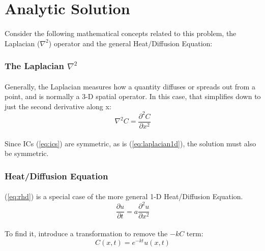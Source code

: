 \section{Analytic Solution}
\paragraph{}
Consider the following mathematical concepts related to this problem, the Laplacian ($\nabla^2$) operator and the general Heat/Diffusion Equation:

\subsubsection*{The Laplacian $\nabla^2$}
\paragraph{}
Generally, the Laplacian measures how a quantity diffuses or spreads out from a point, and is normally a 3-D spatial operator. In this case, that simplifies down to just the second derivative along x:
\begin{equation}
\label{eq:laplacian1d}
\nabla^2 C = \frac{\partial^2 C}{\partial x^2}
\end{equation}
\paragraph{}
Since ICs (\ref{eq:ics}) are symmetric, as is (\ref{eq:laplacian1d}), the solution must also be symmetric.

\subsubsection*{Heat/Diffusion Equation}
\paragraph{}
(\ref{eq:rhd}) is a special case of the more general 1-D Heat/Diffusion Equation. 
\begin{equation}
\label{eq:hde}
\frac{\partial u}{\partial t} = a \frac{\partial^2 u}{\partial x^2}
\end{equation}
\paragraph{}
To find it, introduce a transformation to remove the $-kC$ term:
\begin{equation}
\label{eq:c1}
C(x,t) = e^{-kt} u(x,t)
\end{equation}
